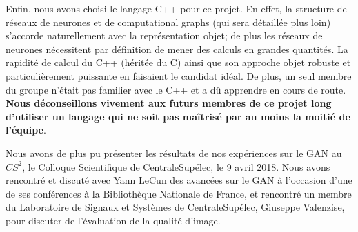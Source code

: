 Enfin, nous avons choisi le langage C++ pour ce projet. En effet, la structure de réseaux de neurones et de computational graphs (qui sera détaillée plus loin) s'accorde naturellement avec la représentation objet; de plus les réseaux de neurones nécessitent par définition de mener des calculs en grandes quantités. La rapidité de calcul du C++ (héritée du C) ainsi que son approche objet robuste et particulièrement puissante en faisaient le candidat idéal. De plus, un seul membre du groupe n'était pas familier avec le C++ et a dû apprendre en cours de route. \textbf{Nous déconseillons vivement aux futurs membres de ce projet long d'utiliser un langage qui ne soit pas maîtrisé par au moins la moitié de l'équipe}. 

Nous avons de plus pu présenter les résultats de nos expériences sur le GAN au $CS^2$, le Colloque Scientifique de CentraleSupélec, le 9 avril 2018. Nous avons rencontré et discuté avec Yann LeCun des avancées sur le GAN à l'occasion d'une de ses conférences à la Bibliothèque Nationale de France, et rencontré un membre du Laboratoire de Signaux et Systèmes de CentraleSupélec, Giuseppe Valenzise, pour discuter de l'évaluation de la qualité d'image.

\newpage
